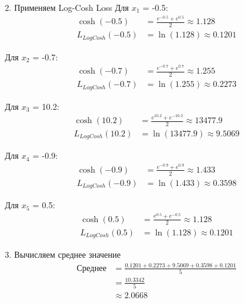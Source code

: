 2. Применяем Log-Cosh Loss
Для $x_1$ = -0.5:
\[
\begin{aligned}
\cosh(-0.5) &= \frac{e^{-0.5} + e^{0.5}}{2} \approx 1.128 \\
L_{LogCosh}(-0.5) &= \ln(1.128) \approx 0.1201
\end{aligned}
\]

Для $x_2$ = -0.7:
\[
\begin{aligned}
\cosh(-0.7) &= \frac{e^{-0.7} + e^{0.7}}{2} \approx 1.255 \\
L_{LogCosh}(-0.7) &= \ln(1.255) \approx 0.2273
\end{aligned}
\]

Для $x_3$ = 10.2:
\[
\begin{aligned}
\cosh(10.2) &= \frac{e^{10.2} + e^{-10.2}}{2} \approx 13477.9 \\
L_{LogCosh}(10.2) &= \ln(13477.9) \approx 9.5069
\end{aligned}
\]

Для $x_4$ = -0.9:
\[
\begin{aligned}
\cosh(-0.9) &= \frac{e^{-0.9} + e^{0.9}}{2} \approx 1.433 \\
L_{LogCosh}(-0.9) &= \ln(1.433) \approx 0.3598
\end{aligned}
\]

Для $x_5$ = 0.5:
\[
\begin{aligned}
\cosh(0.5) &= \frac{e^{0.5} + e^{-0.5}}{2} \approx 1.128 \\
L_{LogCosh}(0.5) &= \ln(1.128) \approx 0.1201
\end{aligned}
\]

3. Вычисляем среднее значение
\[
\begin{aligned}
\text{Среднее} &= \frac{0.1201 + 0.2273 + 9.5069 + 0.3598 + 0.1201}{5} \\
&= \frac{10.3342}{5} \\
&\approx 2.0668
\end{aligned}
\]

